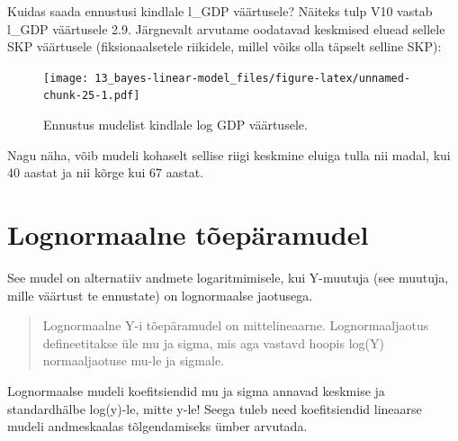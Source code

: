 \documentclass[]{book}
\newenvironment{Shaded}{\begin{snugshade}}{\end{snugshade}}
\newcommand{\CommentTok}[1]{\textcolor[rgb]{0.56,0.35,0.01}{\textit{#1}}}
\newcommand{\DataTypeTok}[1]{\textcolor[rgb]{0.13,0.29,0.53}{#1}}
\newcommand{\FloatTok}[1]{\textcolor[rgb]{0.00,0.00,0.81}{#1}}
\newcommand{\KeywordTok}[1]{\textcolor[rgb]{0.13,0.29,0.53}{\textbf{#1}}}
\newcommand{\NormalTok}[1]{#1}
\newcommand{\OperatorTok}[1]{\textcolor[rgb]{0.81,0.36,0.00}{\textbf{#1}}}
\begin{document}
Kuidas saada ennustusi kindlale l\_GDP väärtusele? Näiteks tulp V10 vastab l\_GDP väärtusele 2.9. Järgnevalt arvutame oodatavad keskmised eluead sellele SKP väärtusele (fiksionaalsetele riikidele, millel võiks olla täpselt selline SKP):

\begin{Shaded}
\end{Shaded}

\begin{figure}
\centering
\texttt{[image: 13\_bayes-linear-model\_files/figure-latex/unnamed-chunk-25-1.pdf]}
\caption{\label{fig:unnamed-chunk-25}Ennustus mudelist kindlale log GDP väärtusele.}
\end{figure}

\begin{Shaded}
\end{Shaded}

Nagu näha, võib mudeli kohaselt sellise riigi keskmine eluiga tulla nii madal, kui 40 aastat ja nii kõrge kui 67 aastat.

\hypertarget{lognormaalne-toeparamudel}{%
\section*{Lognormaalne tõepäramudel}\label{lognormaalne-toeparamudel}}

See mudel on alternatiiv andmete logaritmimisele, kui Y-muutuja (see muutuja, mille väärtust te ennustate) on lognormaalse jaotusega.

\begin{quote}
Lognormaalne Y-i tõepäramudel on mittelineaarne. Lognormaaljaotus defineetitakse üle mu ja sigma, mis aga vastavd hoopis log(Y) normaaljaotuse mu-le ja sigmale.
\end{quote}

Lognormaalse mudeli koefitsiendid mu ja sigma annavad keskmise ja standardhälbe log(y)-le, mitte y-le! Seega tuleb need koefitsiendid lineaarse mudeli andmeskaalas tõlgendamiseks ümber arvutada.
\end{document}
